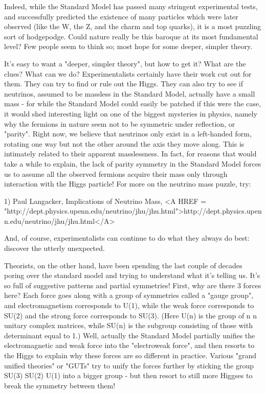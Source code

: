 Indeed, while the Standard Model has passed many stringent experimental
tests, and successfully predicted the existence of many particles which
were later observed (like the W, the Z, and the charm and top quarks),
it is a most puzzling sort of hodgepodge.  Could nature really be this
baroque at its most fundamental level?  Few people seem to think so;
most hope for some deeper, simpler theory.

It's easy to want a "deeper, simpler theory", but how to get it?  What
are the clues?  What can we do?  Experimentalists certainly have their
work cut out for them.  They can try to find or rule out the Higgs.
They can also try to see if neutrinos, assumed to be massless in the
Standard Model, actually have a small mass - for while the Standard
Model could easily be patched if this were the case, it would shed
interesting light on one of the biggest mysteries in physics, namely why
the fermions in nature seem not to be symmetric under reflection, or
"parity".  Right now, we believe that neutrinos only exist in a
left-handed form, rotating one way but not the other around the axis
they move along.  This is intimately related to their apparent
masslessness.  In fact, for reasons that would take a while to explain,
the lack of parity symmetry in the Standard Model forces us to assume
all the observed fermions acquire their mass only through interaction with the Higgs
particle!  For more on the neutrino mass puzzle, try:

1) Paul Langacker, Implications of Neutrino Mass,
<A HREF = "http://dept.physics.upenn.edu/neutrino/jhu/jhu.html">http://dept.physics.upenn.edu/neutrino/jhu/jhu.html</A>

And, of course, experimentalists can continue to do what they always do
best: discover the utterly unexpected.  

Theorists, on the other hand, have been spending the last couple of
decades poring over the standard model and trying to understand what
it's telling us.  It's so full of suggestive patterns and partial 
symmetries!  First, why are there 3 forces here?  Each force goes along
with a group of symmetries called a "gauge group", and electromagnetism
corresponds to U(1), while the weak force corresponds to SU(2) and the
strong force corresponds to SU(3).  (Here U(n) is the group of n \times  n
unitary complex matrices, while SU(n) is the subgroup consisting of
those with determinant equal to 1.)  Well, actually the Standard Model
partially unifies the electromagnetic and weak force into the
"electroweak force", and then resorts to the Higgs to explain why these
forces are so different in practice.  Various "grand unified theories"
or "GUTs" try to unify the forces further by sticking the group 
SU(3) \times  SU(2) \times  U(1) into a bigger group - but then resort to 
still more Higgses to break the symmetry between them!


